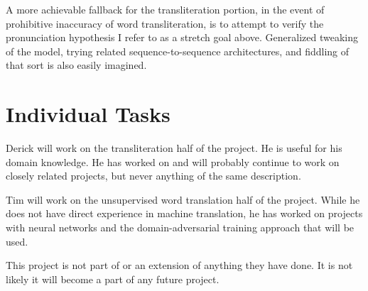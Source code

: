 \documentclass{article}
\begin{document}
A more achievable fallback for the transliteration portion,
in the event of prohibitive inaccuracy of word transliteration,
is to attempt to verify
the pronunciation hypothesis I refer to as a stretch goal above.
Generalized tweaking of the model,
trying related sequence-to-sequence architectures,
and fiddling of that sort is also easily imagined.

\section*{Individual Tasks}

Derick will work on the transliteration half of the project.
He is useful for his domain knowledge.
He has worked on and will probably continue to work on
closely related projects,
but never anything of the same description.

Tim will work on the unsupervised word translation half of the project.
While he does not have direct experience in machine translation, he has
worked on projects with neural networks and the domain-adversarial training
approach that will be used.

This project is not part of or an extension of anything they have done.
It is not likely it will become a part of any future project.

{}

\end{document}
